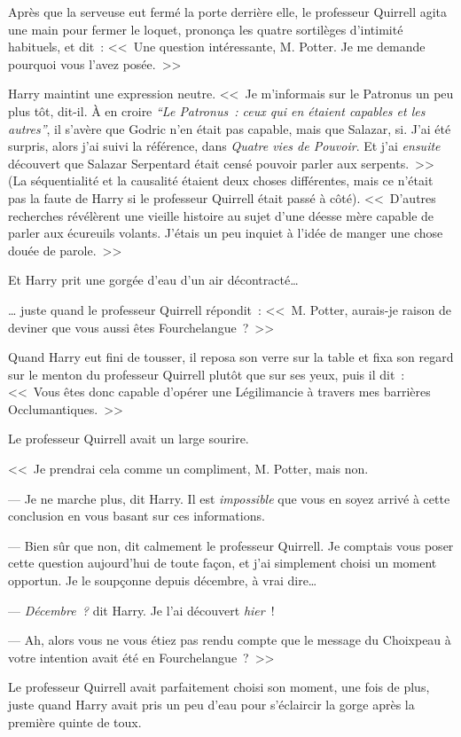 Après que la serveuse eut fermé la porte derrière elle, le professeur Quirrell agita une main pour fermer le loquet, prononça les quatre sortilèges d'intimité habituels, et dit~: <<~Une question intéressante, M. Potter. Je me demande pourquoi vous l'avez posée.~>>

Harry maintint une expression neutre. <<~Je m'informais sur le Patronus un peu plus tôt, dit-il. À en croire \emph{“Le Patronus~: ceux qui en étaient capables et les autres”}, il s'avère que Godric n'en était pas capable, mais que Salazar, si. J'ai été surpris, alors j'ai suivi la référence, dans \emph{Quatre vies de Pouvoir}. Et j'ai \emph{ensuite} découvert que Salazar Serpentard était censé pouvoir parler aux serpents.~>> (La séquentialité et la causalité étaient deux choses différentes, mais ce n'était pas la faute de Harry si le professeur Quirrell était passé à côté). <<~D'autres recherches révélèrent une vieille histoire au sujet d'une déesse mère capable de parler aux écureuils volants. J'étais un peu inquiet à l'idée de manger une chose douée de parole.~>>

Et Harry prit une gorgée d'eau d'un air décontracté…

… juste quand le professeur Quirrell répondit~: <<~M. Potter, aurais-je raison de deviner que vous aussi êtes Fourchelangue~?~>>

Quand Harry eut fini de tousser, il reposa son verre sur la table et fixa son regard sur le menton du professeur Quirrell plutôt que sur ses yeux, puis il dit~: <<~Vous êtes donc capable d'opérer une Légilimancie à travers mes barrières Occlumantiques.~>>

Le professeur Quirrell avait un large sourire.

<<~Je prendrai cela comme un compliment, M. Potter, mais non.

--- Je ne marche plus, dit Harry. Il est \emph{impossible} que vous en soyez arrivé à cette conclusion en vous basant sur ces informations.

--- Bien sûr que non, dit calmement le professeur Quirrell. Je comptais vous poser cette question aujourd'hui de toute façon, et j'ai simplement choisi un moment opportun. Je le soupçonne depuis décembre, à vrai dire…

--- \emph{Décembre~?} dit Harry. Je l'ai découvert \emph{hier}~!

--- Ah, alors vous ne vous étiez pas rendu compte que le message du Choixpeau à votre intention avait été en Fourchelangue~?~>>

Le professeur Quirrell avait parfaitement choisi son moment, une fois de plus, juste quand Harry avait pris un peu d'eau pour s'éclaircir la gorge après la première quinte de toux.

